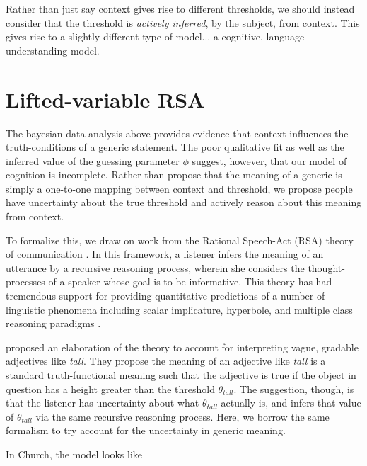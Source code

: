 \documentclass[10pt,letterpaper]{article}
\begin{document}
Rather than just say context gives rise to different thresholds, we should instead consider that the threshold is \emph{actively inferred}, by the subject, from context. This gives rise to a slightly different type of model... a cognitive, language-understanding model.


\section{Lifted-variable RSA}

The bayesian data analysis above provides evidence that context influences the truth-conditions of a generic statement. The poor qualitative fit as well as the inferred value of the guessing parameter $\phi$ suggest, however, that our model of cognition is incomplete. Rather than propose that the meaning of a generic is simply a one-to-one mapping between context and threshold, we propose people have uncertainty about the true threshold and actively reason about this meaning from context. 

To formalize this, we draw on work from the Rational Speech-Act (RSA) theory of communication \cite{Frank2012}. In this framework, a listener infers the meaning of an utterance by a recursive reasoning process, wherein she considers the thought-processes of a speaker whose goal is to be informative. This theory has had tremendous support for providing quantitative predictions of a number of linguistic phenomena including scalar implicature, hyperbole, and multiple class reasoning paradigms \cite{Goodman2013, Kao2014, Tessler2014, Lassiter2014a}. 

 proposed an elaboration of the theory to account for interpreting vague, gradable adjectives like \emph{tall}. They propose the meaning of an adjective like \emph{tall} is a standard truth-functional meaning such that the adjective is true if the object in question has a height greater than the threshold $\theta_{tall}$. The suggestion, though, is that the listener has uncertainty about what $\theta_{tall}$ actually is, and infers that value of $\theta_{tall}$ via the same recursive reasoning process. Here, we borrow the same formalism to try account for the uncertainty in generic meaning.

In Church, the model looks like
\end{document}
